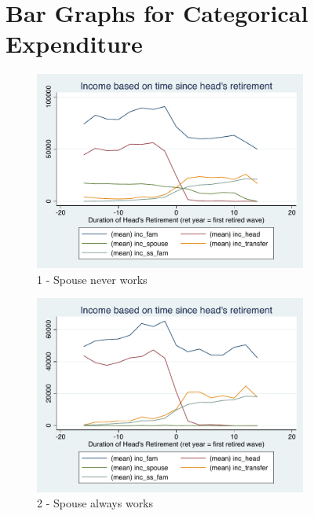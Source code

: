 \documentclass[11pt]{article}
\begin{document}
\section{Bar Graphs for Categorical Expenditure}

\begin{figure}[h]
	\caption{1 - Spouse never works}
	\centering
	\includegraphics[width=0.8\textwidth]{../IncomeAroundRetirement/Income_with_spouse_definition_1.pdf}
\end{figure}

\begin{figure}[h]
	\caption{2 - Spouse always works}
	\centering
	\includegraphics[width=0.8\textwidth]{../IncomeAroundRetirement/Income_with_spouse_definition_2.pdf}
\end{figure}
\end{document}
